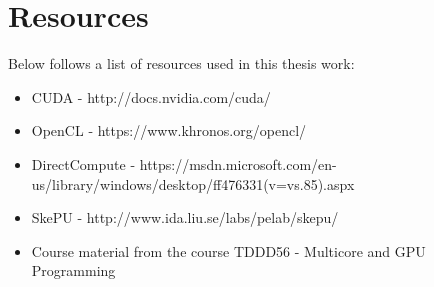 \documentclass{article}
\begin{document}
\section{Resources}

Below follows a list of resources used in this thesis work:

\begin{itemize}
    \item CUDA - http://docs.nvidia.com/cuda/
    \item OpenCL - https://www.khronos.org/opencl/
    \item DirectCompute - https://msdn.microsoft.com/en-us/library/windows/desktop/ff476331(v=vs.85).aspx
    \item SkePU - http://www.ida.liu.se/labs/pelab/skepu/
    \item Course material from the course TDDD56 - Multicore and GPU Programming 
\end{itemize}




\end{document}
